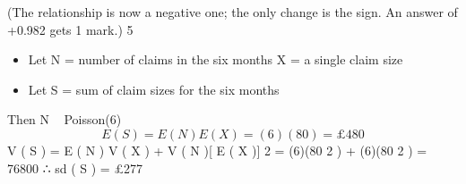 \documentclass[a4paper,12pt]{article}
\begin{document}
(The relationship is now a negative one; the only change is the sign. An answer of
+0.982 gets 1 mark.)
5
\begin{itemize}
\item Let N = number of claims in the six months
\itemLet X = a single claim size
\item Let S = sum of claim sizes for the six months
\end{itemize}
Then N ~ Poisson(6)
\[E ( S ) = E ( N ) E ( X ) = (6)(80) = £480\]
V ( S ) = E ( N ) V ( X ) + V ( N )[ E ( X )] 2 = (6)(80 2 ) + (6)(80 2 ) = 76800
∴ sd ( S ) = £277
\end{document}
